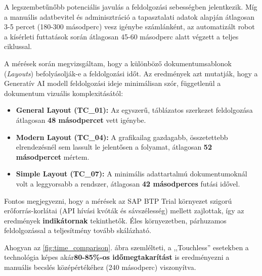 A legszembetűnőbb potenciális javulás a feldolgozási sebességben jelentkezik. Míg a manuális adatbevitel és adminisztráció a tapasztalati adatok alapján átlagosan 3-5 percet (180-300 másodperc) vesz igénybe számlánként, az automatizált robot a kísérleti futtatások során átlagosan 45-60 másodperc alatt végzett a teljes ciklussal.

A mérések során megvizsgáltam, hogy a különböző dokumentumsablonok (\textit{Layouts}) befolyásolják-e a feldolgozási időt. Az eredmények azt mutatják, hogy a Generatív AI modell feldolgozási ideje minimálisan szór, függetlenül a dokumentum vizuális komplexitásától:

\begin{itemize}
    \item \textbf{General Layout (TC\_01):} Az egyszerű, táblázatos szerkezet feldolgozása átlagosan \textbf{48 másodpercet} vett igénybe.
    \item \textbf{Modern Layout (TC\_04):} A grafikailag gazdagabb, összetettebb elrendezésnél sem lassult le jelentősen a folyamat, átlagosan \textbf{52 másodpercet} mértem.
    \item \textbf{Simple Layout (TC\_07):} A minimális adattartalmú dokumentumoknál volt a leggyorsabb a rendszer, átlagosan \textbf{42 másodperces} futási idővel.
\end{itemize}

Fontos megjegyezni, hogy a mérések az SAP BTP Trial környezet szigorú erőforrás-korlátai (API hívási kvóták és sávszélesség) mellett zajlottak, így az eredmények \textbf{indikátornak} tekinthetők. Éles környezetben, párhuzamos feldolgozással a teljesítmény tovább skálázható.

Ahogyan az \ref{fig:time_comparison}. ábra szemlélteti, a ,,Touchless'' esetekben a technológia képes akár\textbf{80-85\%-os időmegtakarítást} is eredményezni a manuális becslés középértékéhez (240 másodperc) viszonyítva.


